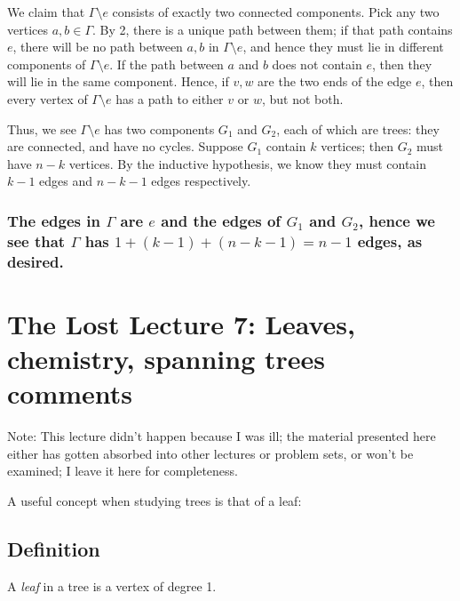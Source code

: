 \documentclass[]{article}
\begin{document}
We claim that \(\Gamma\setminus e\) consists of exactly two connected
components. Pick any two vertices \(a,b\in\Gamma\). By 2, there is a
unique path between them; if that path contains \(e\), there will be no
path between \(a, b\) in \(\Gamma\setminus e\), and hence they must lie
in different components of \(\Gamma\setminus e\). If the path between
\(a\) and \(b\) does not contain \(e\), then they will lie in the same
component. Hence, if \(v, w\) are the two ends of the edge \(e\), then
every vertex of \(\Gamma\setminus e\) has a path to either \(v\) or
\(w\), but not both.

Thus, we see \(\Gamma\setminus e\) has two components \(G_1\) and
\(G_2\), each of which are trees: they are connected, and have no
cycles. Suppose \(G_1\) contain \(k\) vertices; then \(G_2\) must have
\(n-k\) vertices. By the inductive hypothesis, we know they must contain
\(k-1\) edges and \(n-k-1\) edges respectively.

\subsubsection{\texorpdfstring{The edges in \(\Gamma\) are \(e\) and the
edges of \(G_1\) and \(G_2\), hence we see that \(\Gamma\) has
\(1+(k-1)+(n-k-1)=n-1\) edges, as
desired.}{The edges in \textbackslash{}Gamma are e and the edges of G\_1 and G\_2, hence we see that \textbackslash{}Gamma has 1+(k-1)+(n-k-1)=n-1 edges, as desired.}}\label{the-edges-in-gamma-are-e-and-the-edges-of-gux5f1-and-gux5f2-hence-we-see-that-gamma-has-1k-1n-k-1n-1-edges-as-desired.}

\section{The Lost Lecture 7: Leaves, chemistry, spanning trees comments} 

Note: This lecture didn't happen because I was ill; the material
presented here either has gotten absorbed into other lectures or problem
sets, or won't be examined; I leave it here for completeness.

A useful concept when studying trees is that of a leaf:

\subsection{Definition}\label{definition-4}

A \emph{leaf} in a tree is a vertex of degree 1.
\end{document}
